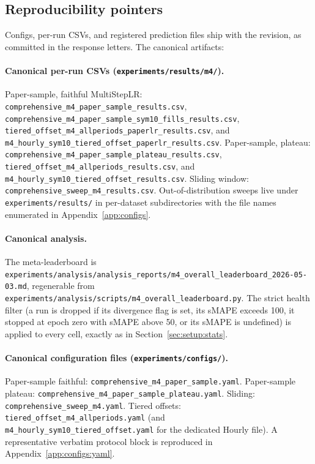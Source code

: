 \subsection{Reproducibility pointers}
\label{app:protocol:repro}

Configs, per-run CSVs, and registered prediction files ship with the
revision, as committed in the response letters. The canonical artifacts:

\begin{sloppypar}
\paragraph{Canonical per-run CSVs
(\nolinkurl{experiments/results/m4/}).} Paper-sample, faithful MultiStepLR:
\nolinkurl{comprehensive_m4_paper_sample_results.csv},
\nolinkurl{comprehensive_m4_paper_sample_sym10_fills_results.csv},
\nolinkurl{tiered_offset_m4_allperiods_paperlr_results.csv}, and
\nolinkurl{m4_hourly_sym10_tiered_offset_paperlr_results.csv}.
Paper-sample, plateau:
\nolinkurl{comprehensive_m4_paper_sample_plateau_results.csv},
\nolinkurl{tiered_offset_m4_allperiods_results.csv}, and
\nolinkurl{m4_hourly_sym10_tiered_offset_results.csv}.
Sliding window: \nolinkurl{comprehensive_sweep_m4_results.csv}.
Out-of-distribution sweeps live under
\nolinkurl{experiments/results/} in per-dataset subdirectories with the file
names enumerated in Appendix~\ref{app:configs}.
\end{sloppypar}

\paragraph{Canonical analysis.} The meta-leaderboard is
\nolinkurl{experiments/analysis/analysis_reports/m4_overall_leaderboard_2026-05-03.md},
regenerable from
\nolinkurl{experiments/analysis/scripts/m4_overall_leaderboard.py}. The
strict health filter (a run is dropped if its divergence flag is set, its
sMAPE exceeds 100, it stopped at epoch zero with sMAPE above 50, or its
sMAPE is undefined) is applied to every cell, exactly as in
Section~\ref{sec:setup:stats}.

\begin{sloppypar}
\paragraph{Canonical configuration files
(\nolinkurl{experiments/configs/}).} Paper-sample faithful:
\nolinkurl{comprehensive_m4_paper_sample.yaml}. Paper-sample plateau:
\nolinkurl{comprehensive_m4_paper_sample_plateau.yaml}. Sliding:
\nolinkurl{comprehensive_sweep_m4.yaml}. Tiered offsets:
\nolinkurl{tiered_offset_m4_allperiods.yaml} (and
\nolinkurl{m4_hourly_sym10_tiered_offset.yaml} for the dedicated Hourly
file). A representative verbatim protocol block is reproduced in
Appendix~\ref{app:configs:yaml}.
\end{sloppypar}

